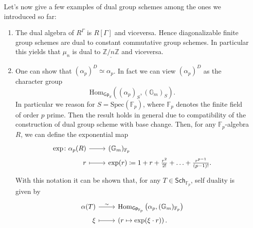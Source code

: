 \documentclass[../Main]{subfiles}
\begin{document}
Let's now give a few examples of dual group schemes among the ones we introduced so far:
\begin{ex}[]\leavevmode\vspace{-.2\baselineskip}
\begin{enumerate}
	\item The dual algebra of $R^\Gamma$ is $R[\Gamma]$ and viceversa.
		Hence diagonalizable finite group schemes are dual to constant commutative group schemes.
		In particular this yields that $\mu_n$ is dual to $\underline{\mathbb{Z}/n\mathbb{Z}}$
		and viceversa.

	\item One can show that $\left( \alpha_p \right)^D \simeq \alpha_p$.
		In fact we can view $(\alpha_p)^D$ as the character group
		\begin{equation*}
			\mathrm{Hom}_{\mathsf{Gp}_S} \left( (\alpha_p)_S, (\mathbb{G}_m)_S \right)
		.\end{equation*}
		In particular we reason for $S = \mathrm{Spec}(\mathbb{F}_p)$, where
		$\mathbb{F}_{p}$ denotes the finite field of order $p$ prime. Then
		the result holds in general due to compatibility of the construction of
		dual group scheme with base change.
		Then, for any $\mathbb{F}_{p}$-algebra $R$, we can define the exponential map
		\begin{equation*}
		\begin{tikzcd}[row sep = 0ex
			,/tikz/column 1/.append style={anchor=base east}
			,/tikz/column 2/.append style={anchor=base west}]
			\mathrm{exp}\colon \alpha_p(R) \arrow[r, "", rightarrow] &
			(\mathbb{G}_m)_{ \mathbb{F}_{p} } \\
			r \arrow[r, "", mapsto] & \mathrm{exp}(r) \coloneqq
			1 + r + \frac{r^2}{2!} + \ldots + \frac{r^{p-1}}{\left( p-1 \right)!}
		.\end{tikzcd}
		\end{equation*} 
		With this notation it can be shown that, for any
		$T \in \mathsf{Sch}_{ \mathbb{F}_{p} }$, self duality is given by
		\begin{equation*}
		\begin{tikzcd}[row sep = 0ex
			,/tikz/column 1/.append style={anchor=base east}
			,/tikz/column 2/.append style={anchor=base west}]
			\alpha(T) \arrow[r, "\sim", rightarrow] &
			\mathrm{Hom}_{\mathsf{Gp}_{ \mathbb{F}_{p} }}
			\left( \alpha_p, (\mathbb{G}_m)_{\mathbb{F}_{p}} \right) \\
			\xi \arrow[r, "", mapsto] & 
			\left( r \mapsto \mathrm{exp}(\xi \cdot r) \right)
		.\end{tikzcd}
		\end{equation*} 
\end{enumerate}
\end{ex}
\end{document}
